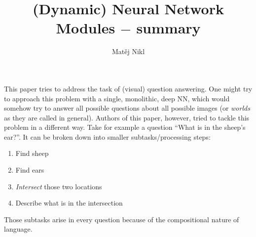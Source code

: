 \documentclass[a4paper,twocolumn]{article}
\title{(Dynamic) Neural Network Modules $-$ summary}
\author{Matěj Nikl}
\begin{document}
\maketitle
This paper tries to address the task of (visual) question answering. One might try to approach this problem with a single, monolithic, deep NN, which would somehow try to answer all possible questions about all possible images (or \textit{worlds} as they are called in general). Authors of this paper, however, tried to tackle this problem in a different way. Take for example a question ``What is in the sheep's ear?''. It can be broken down into smaller subtasks/processing steps:
    \begin{enumerate}
        \item Find sheep
        \item Find ears
        \item \textit{Intersect} those two locations
        \item Describe what is in the intersection
    \end{enumerate}
Those subtasks arise in every question because of the compositional nature of language.
\end{document}
